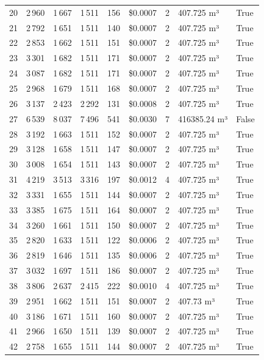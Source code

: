 \documentclass[a4paper,11pt]{article}
\begin{document}
\begin{table}[ht]
\begin{tabular}{r r r r r r r p{3cm} l}
20 & 2\,960 & 1\,667 & 1\,511 & 156 & \$0.0007 & 2 & 407.725 m³ & True \\
21 & 2\,792 & 1\,651 & 1\,511 & 140 & \$0.0007 & 2 & 407.725 m³ & True \\
22 & 2\,853 & 1\,662 & 1\,511 & 151 & \$0.0007 & 2 & 407.725 m³ & True \\
23 & 3\,301 & 1\,682 & 1\,511 & 171 & \$0.0007 & 2 & 407.725 m³ & True \\
24 & 3\,087 & 1\,682 & 1\,511 & 171 & \$0.0007 & 2 & 407.725 m³ & True \\
25 & 2\,968 & 1\,679 & 1\,511 & 168 & \$0.0007 & 2 & 407.725 m³ & True \\
26 & 3\,137 & 2\,423 & 2\,292 & 131 & \$0.0008 & 2 & 407.725 m³ & True \\
27 & 6\,539 & 8\,037 & 7\,496 & 541 & \$0.0030 & 7 & 416385.24 m³ & False \\
28 & 3\,192 & 1\,663 & 1\,511 & 152 & \$0.0007 & 2 & 407.725 m³ & True \\
29 & 3\,128 & 1\,658 & 1\,511 & 147 & \$0.0007 & 2 & 407.725 m³ & True \\
30 & 3\,008 & 1\,654 & 1\,511 & 143 & \$0.0007 & 2 & 407.725 m³ & True \\
31 & 4\,219 & 3\,513 & 3\,316 & 197 & \$0.0012 & 4 & 407.725 m³ & True \\
32 & 3\,331 & 1\,655 & 1\,511 & 144 & \$0.0007 & 2 & 407.725 m³ & True \\
33 & 3\,385 & 1\,675 & 1\,511 & 164 & \$0.0007 & 2 & 407.725 m³ & True \\
34 & 3\,260 & 1\,661 & 1\,511 & 150 & \$0.0007 & 2 & 407.725 m³ & True \\
35 & 2\,820 & 1\,633 & 1\,511 & 122 & \$0.0006 & 2 & 407.725 m³ & True \\
36 & 2\,819 & 1\,646 & 1\,511 & 135 & \$0.0006 & 2 & 407.725 m³ & True \\
37 & 3\,032 & 1\,697 & 1\,511 & 186 & \$0.0007 & 2 & 407.725 m³ & True \\
38 & 3\,806 & 2\,637 & 2\,415 & 222 & \$0.0010 & 4 & 407.725 m³ & True \\
39 & 2\,951 & 1\,662 & 1\,511 & 151 & \$0.0007 & 2 & 407.73 m³ & True \\
40 & 3\,186 & 1\,671 & 1\,511 & 160 & \$0.0007 & 2 & 407.725 m³ & True \\
41 & 2\,966 & 1\,650 & 1\,511 & 139 & \$0.0007 & 2 & 407.725 m³ & True \\
42 & 2\,758 & 1\,655 & 1\,511 & 144 & \$0.0007 & 2 & 407.725 m³ & True \\

\end{tabular}
\end{table}
\end{document}
